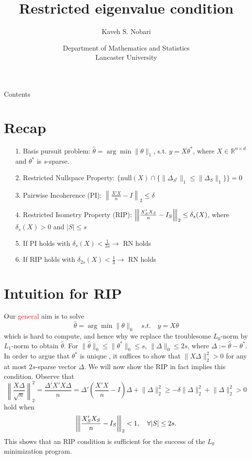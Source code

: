 \documentclass[10pt,handout,english]{beamer}
\title[]{Restricted eigenvalue condition}
\author[Kaveh S. Nobari]{Kaveh S. Nobari}
\institute[]{Lectures in High-Dimensional Statistics}
\date[27/10/2020]
{Department of Mathematics and Statistics\\ Lancaster University}
\newcommand{\R}{\mathbb{R}}
\newcommand{\vertiii}[1]{{\left\vert\kern-0.25ex\left\vert\kern-0.25ex\left\vert #1 
    \right\vert\kern-0.25ex\right\vert\kern-0.25ex\right\vert}}
\begin{document}
\begin{frame}
\titlepage
\end{frame}


\begin{frame}{Contents}
\tableofcontents
\end{frame}

\section{Recap}

\begin{frame}[allowframebreaks]
\begin{itemize}
\setlength\itemsep{0.5em}
\item[1.] Basis pursuit problem: $\hat{\theta}=\arg \min \lVert \theta\rVert_1$, s.t. $y=X\theta^*$, where $X\in\R^{n\times d}$ and $\theta^*$ is $s$-sparse. \justifying
\item[2.] Restricted Nullspace Property: $\{\text{null}(X)\cap \{\lVert\Delta_{S^c}\rVert_1\leq \lVert\Delta_S\rVert_1\}\}=0$\justifying
\item[3.] Pairwise Incoherence (PI): $\left\lVert \frac{X'X}{n}-I \right\rVert_2\leq \delta$ \justifying
\item[4.] Restricted Isometry Property (RIP): $\vertiii{\frac{X_S'X_S}{n}- I_S}_2\leq \delta_s(X)$, where $\delta_s(X)>0$ and $\lvert S \rvert\leq s$\justifying
\item[5.] If PI holds with $\delta_s(X)<\frac{1}{3s} \rightarrow$ RN holds\justifying
\item[6.] If RIP holds with $\delta_{2s}(X)<\frac{1}{3}\rightarrow$ RN holds\justifying
\end{itemize}
\end{frame}

\section{Intuition for RIP}

\begin{frame}[allowframebreaks]
Our \textcolor{red}{general} aim is to solve 
\[
\hat{\theta}=\arg\min\lVert\theta\rVert_0\quad s.t.\quad y=X\theta
\]
which is hard to compute, and hence why we replace the troublesome $L_0$-norm by $L_1$-norm to obtain $\hat{\theta}$. For $\lVert\hat{\theta}\rVert_0\leq\lVert\theta^*\rVert_0\leq s$, $\lVert\Delta \rVert_0\leq 2s$, where $\Delta:=\hat{\theta}-\theta^*$.
\justifying
In order to argue that $\theta^*$ is unique , it suffices to show that $\lVert X\Delta \rVert_2^2>0$ for any at most $2s$-sparse vector $\Delta$.
\justifying
We will now show the RIP in fact implies this condition. Observe that
\[
\left\lVert\frac{X\Delta}{\sqrt{n}}\right\rVert_2^2=\frac{\Delta'X'X\Delta}{n}=\Delta'\left(\frac{X'X}{n}-I\right)\Delta+\lVert\Delta\rVert_2^2\geq -\delta\lVert\Delta\rVert_2^2+\lVert\Delta\rVert_2^2>0
\]
hold when 
\[
\vertiii{\frac{X'_SX_S}{n}- I_S}_2<1,\quad\forall \lvert S\rvert\leq 2s. 
\]
This shows that an RIP condition is sufficient for the success of the $L_0$ minimization program.
\end{frame}
\end{document}
